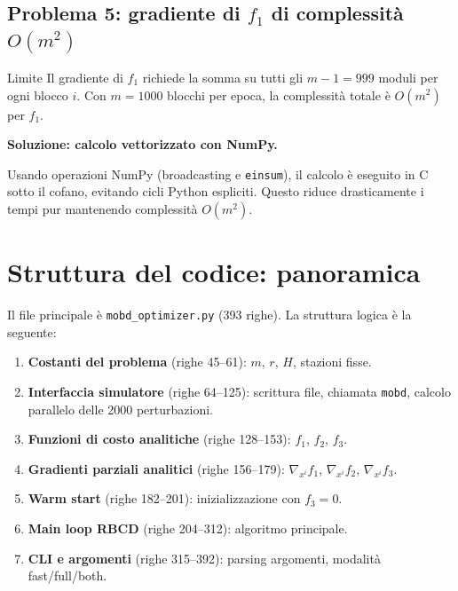 \documentclass[12pt,a4paper]{article}
\theoremstyle{definition}
\newcommand{\grad}{\nabla}
\begin{document}
\subsection{Problema 5: gradiente di $f_1$ di complessità $O(m^2)$}

\begin{warnbox}{Limite}
Il gradiente di $f_1$ richiede la somma su tutti gli $m-1 = 999$ moduli per ogni blocco $i$.
Con $m = 1000$ blocchi per epoca, la complessità totale è $O(m^2)$ per $f_1$.
\end{warnbox}

\textbf{Soluzione: calcolo vettorizzato con NumPy.}

Usando operazioni NumPy (broadcasting e \texttt{einsum}), il calcolo è eseguito in C sotto
il cofano, evitando cicli Python espliciti. Questo riduce drasticamente i tempi pur mantenendo
complessità $O(m^2)$.

\section{Struttura del codice: panoramica}

Il file principale è \texttt{mobd\_optimizer.py} (393 righe).
La struttura logica è la seguente:

\begin{enumerate}
  \item \textbf{Costanti del problema} (righe 45–61): $m$, $r$, $H$, stazioni fisse.
  \item \textbf{Interfaccia simulatore} (righe 64–125): scrittura file, chiamata \texttt{mobd},
        calcolo parallelo delle 2000 perturbazioni.
  \item \textbf{Funzioni di costo analitiche} (righe 128–153): $f_1$, $f_2$, $f_3$.
  \item \textbf{Gradienti parziali analitici} (righe 156–179): $\grad_{x^i} f_1$,
        $\grad_{x^i} f_2$, $\grad_{x^i} f_3$.
  \item \textbf{Warm start} (righe 182–201): inizializzazione con $f_3 = 0$.
  \item \textbf{Main loop RBCD} (righe 204–312): algoritmo principale.
  \item \textbf{CLI e argomenti} (righe 315–392): parsing argomenti, modalità fast/full/both.
\end{enumerate}
\end{document}
